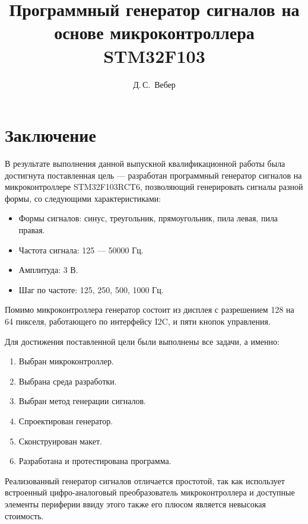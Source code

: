\documentclass[14pt, oneside]{altsu-bachelor}
\title{Программный генератор сигналов на основе микроконтроллера STM32F103}
\author{Д.\,С.~Вебер}
\institute{Институт цифровых технологий, электроники и физики}
\date{\the\year}
\begin{document}
\maketitle

\setcounter{page}{2}
\makeabstract
\tableofcontents






\chapter*{Заключение}
В результате выполнения данной выпускной квалификационной работы была достигнута поставленная цель --- разработан программный генератор сигналов на микроконтроллере STM32F103RCT6, позволяющий генерировать сигналы разной формы, со следующими характеристиками:

\begin{itemize}
	\item Формы сигналов: синус, треугольник, прямоугольник, пила левая, пила правая.
	\item Частота сигнала: 125 --- 50000 Гц.
	\item Амплитуда: 3 В.
	\item Шаг по частоте: 125, 250, 500, 1000 Гц.
\end{itemize}

Помимо микроконтроллера генератор состоит из дисплея с разрешением 128 на 64 пикселя, работающего по интерфейсу I2C, и пяти кнопок управления.

Для достижения поставленной цели были выполнены все задачи, а именно:
\begin{enumerate}
	\item Выбран микроконтроллер.
	\item Выбрана среда разработки.
	\item Выбран метод генерации сигналов.
	\item Спроектирован генератор.
	\item Сконструирован макет.
	\item Разработана и протестирована программа.
\end{enumerate}

Реализованный генератор сигналов отличается простотой, так как использует встроенный цифро-аналоговый преобразователь микроконтроллера и доступные элементы периферии ввиду этого также его плюсом является невысокая стоимость. 




\newpage
{}
\printbibliography[title={Список использованной литературы}]



\makelastpage
\end{document}

